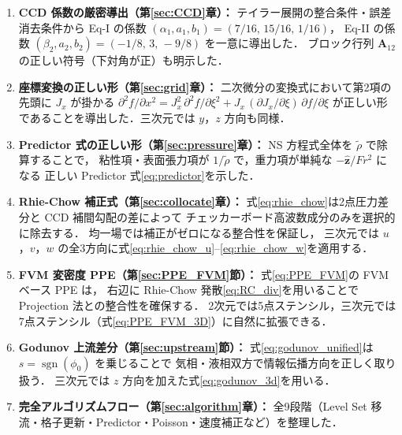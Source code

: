 \documentclass[12pt, a4paper, titlepage]{article}
\newcommand{\jp}[1]{{\normalfont\jpfont #1}}
\begin{document}
\begin{enumerate}[leftmargin=2em, itemsep=4pt]

  \item \jp{\textbf{CCD 係数の厳密導出（第\ref{sec:CCD}章）：}
        テイラー展開の整合条件・誤差消去条件から Eq-I の係数
        $(\alpha_1,a_1,b_1)=(7/16,\,15/16,\,1/16)$，
        Eq-II の係数 $(\beta_2,a_2,b_2)=(-1/8,\,3,\,-9/8)$ を一意に導出した．
        ブロック行列 $\bm{A}_{12}$ の正しい符号（下対角が正）も明示した．}

  \item \jp{\textbf{座標変換の正しい形（第\ref{sec:grid}章）：}
        二次微分の変換式において第2項の先頭に $J_x$ が掛かる
        $\partial^2 f/\partial x^2 = J_x^2\,\partial^2 f/\partial\xi^2
        + J_x\,(\partial J_x/\partial\xi)\,\partial f/\partial\xi$
        が正しい形であることを導出した．三次元では $y$，$z$ 方向も同様．}

  \item \jp{\textbf{Predictor 式の正しい形（第\ref{sec:pressure}章）：}
        NS 方程式全体を $\tilde\rho$ で除算することで，
        粘性項・表面張力項が $1/\tilde\rho$ で，重力項が単純な $-\hat{\bm{z}}/Fr^2$ になる
        正しい Predictor 式\eqref{eq:predictor}を示した．}

  \item \jp{\textbf{Rhie-Chow 補正式（第\ref{sec:collocate}章）：}
        式\eqref{eq:rhie_chow}は2点圧力差分と CCD 補間勾配の差によって
        チェッカーボード高波数成分のみを選択的に除去する．
        均一場では補正がゼロになる整合性を保証し，
        三次元では $u$，$v$，$w$ の全3方向に式\eqref{eq:rhie_chow_u}--\eqref{eq:rhie_chow_w}を適用する．}

  \item \jp{\textbf{FVM 変密度 PPE（第\ref{sec:PPE_FVM}節）：}
        式\eqref{eq:PPE_FVM}の FVM ベース PPE は，
        右辺に Rhie-Chow 発散\eqref{eq:RC_div}を用いることで
        Projection 法との整合性を確保する．
        2次元では5点ステンシル，三次元では7点ステンシル（式\eqref{eq:PPE_FVM_3D}）に自然に拡張できる．}

  \item \jp{\textbf{Godunov 上流差分（第\ref{sec:upstream}節）：}
        式\eqref{eq:godunov_unified}は $s=\operatorname{sgn}(\phi_0)$ を乗じることで
        気相・液相双方で情報伝播方向を正しく取り扱う．
        三次元では $z$ 方向を加えた式\eqref{eq:godunov_3d}を用いる．}

  \item \jp{\textbf{完全アルゴリズムフロー（第\ref{sec:algorithm}章）：}
        全9段階（Level Set 移流・格子更新・Predictor・Poisson・速度補正など）を整理した．}

\end{enumerate}
\end{document}
